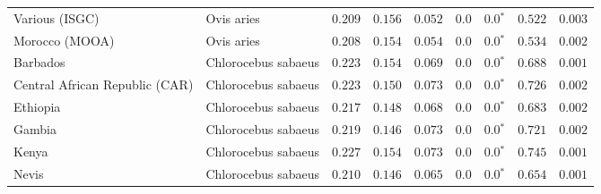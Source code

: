 \begin{center}
\begin{adjustbox}{width = 1\textwidth}
\begin{tabular}{|l|l|r|r|r|r|r|r|r|}
                 Various (ISGC) &           Ovis aries &                                        $ 0.209$ &                                           $ 0.156$ &                      $ 0.052$ &            $0.0$ &                  $\bm{0.0{^*}}$ &                                           $ 0.522$ &           $ 0.003$ \\
                 Morocco (MOOA) &           Ovis aries &                                        $ 0.208$ &                                           $ 0.154$ &                      $ 0.054$ &            $0.0$ &                  $\bm{0.0{^*}}$ &                                           $ 0.534$ &           $ 0.002$ \\
                       Barbados &  Chlorocebus sabaeus &                                        $ 0.223$ &                                           $ 0.154$ &                      $ 0.069$ &            $0.0$ &                  $\bm{0.0{^*}}$ &                                           $ 0.688$ &           $ 0.001$ \\
 Central African Republic (CAR) &  Chlorocebus sabaeus &                                        $ 0.223$ &                                           $ 0.150$ &                      $ 0.073$ &            $0.0$ &                  $\bm{0.0{^*}}$ &                                           $ 0.726$ &           $ 0.002$ \\
                       Ethiopia &  Chlorocebus sabaeus &                                        $ 0.217$ &                                           $ 0.148$ &                      $ 0.068$ &            $0.0$ &                  $\bm{0.0{^*}}$ &                                           $ 0.683$ &           $ 0.002$ \\
                         Gambia &  Chlorocebus sabaeus &                                        $ 0.219$ &                                           $ 0.146$ &                      $ 0.073$ &            $0.0$ &                  $\bm{0.0{^*}}$ &                                           $ 0.721$ &           $ 0.002$ \\
                          Kenya &  Chlorocebus sabaeus &                                        $ 0.227$ &                                           $ 0.154$ &                      $ 0.073$ &            $0.0$ &                  $\bm{0.0{^*}}$ &                                           $ 0.745$ &           $ 0.001$ \\
                          Nevis &  Chlorocebus sabaeus &                                        $ 0.210$ &                                           $ 0.146$ &                      $ 0.065$ &            $0.0$ &                  $\bm{0.0{^*}}$ &                                           $ 0.654$ &           $ 0.001$ \\

\end{tabular}
\end{adjustbox}
\end{center}
